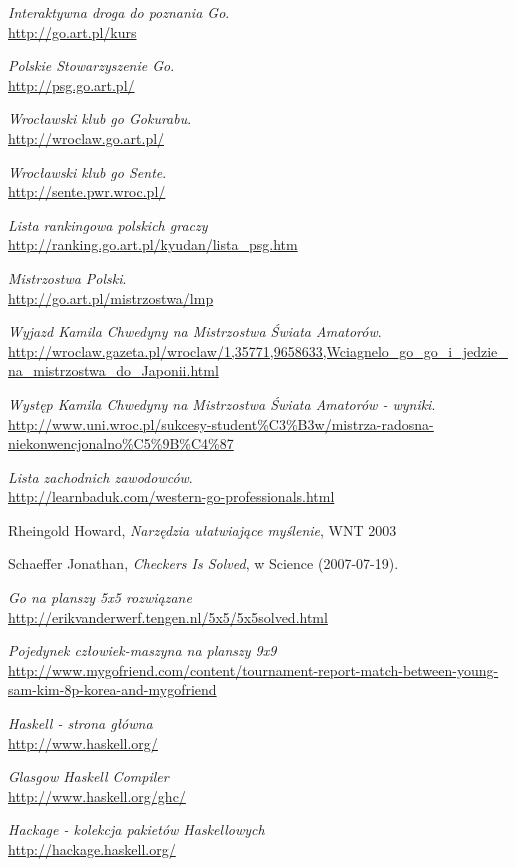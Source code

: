 \documentclass[11pt,leqno]{article}
\begin{document}
\begin{thebibliography}{9}

  \emph{Interaktywna droga do poznania Go}. \\
  \url{http://go.art.pl/kurs}

  \emph{Polskie Stowarzyszenie Go}. \\
  \url{http://psg.go.art.pl/}

  \emph{Wrocławski klub go Gokurabu}. \\
  \url{http://wroclaw.go.art.pl/}

  \emph{Wrocławski klub go Sente}. \\
  \url{http://sente.pwr.wroc.pl/}

  \emph{Lista rankingowa polskich graczy} \\
  \url{http://ranking.go.art.pl/kyudan/lista\_psg.htm}

  \emph{Mistrzostwa Polski}. \\
  \url{http://go.art.pl/mistrzostwa/lmp}

  \emph{Wyjazd Kamila Chwedyny na Mistrzostwa Świata Amatorów}. \\
  \url{http://wroclaw.gazeta.pl/wroclaw/1,35771,9658633,Wciagnelo_go_go_i_jedzie_na_mistrzostwa_do_Japonii.html}

  \emph{Występ Kamila Chwedyny na Mistrzostwa Świata Amatorów - wyniki}. \\
  \url{http://www.uni.wroc.pl/sukcesy-student%C3%B3w/mistrza-radosna-niekonwencjonalno%C5%9B%C4%87}

  \emph{Lista zachodnich zawodowców}. \\
  \url{http://learnbaduk.com/western-go-professionals.html}

  Rheingold Howard, \emph{Narzędzia ułatwiające myślenie}, WNT 2003

  Schaeffer Jonathan, \emph{Checkers Is Solved}, w Science (2007-07-19). 

  \emph{Go na planszy 5x5 rozwiązane} \\
  \url{http://erikvanderwerf.tengen.nl/5x5/5x5solved.html}

  \emph{Pojedynek człowiek-maszyna na planszy 9x9}
  \url{http://www.mygofriend.com/content/tournament-report-match-between-young-sam-kim-8p-korea-and-mygofriend}

  \emph{Haskell - strona główna} \\
  \url{http://www.haskell.org/}

  \emph{Glasgow Haskell Compiler} \\
  \url{http://www.haskell.org/ghc/}

  \emph{Hackage - kolekcja pakietów Haskellowych} \\
  \url{http://hackage.haskell.org/}

\end{thebibliography}
\end{document}
